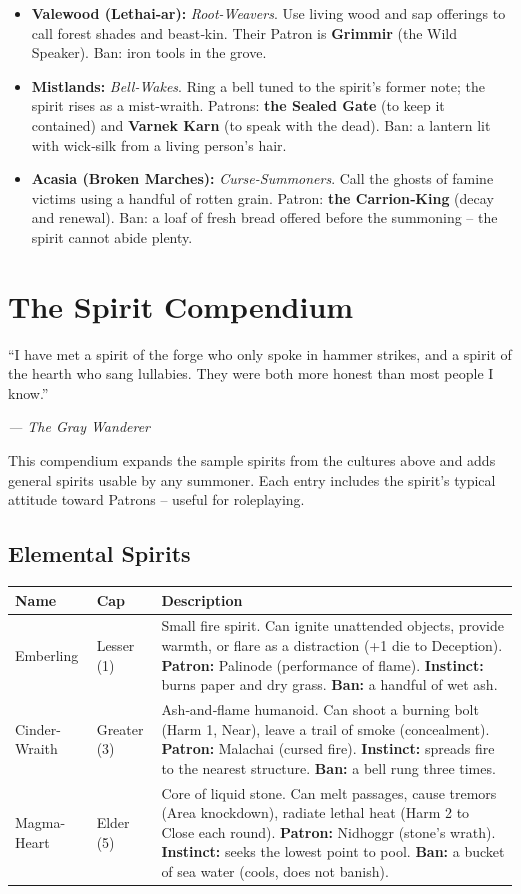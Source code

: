 \documentclass[10pt,a5paper]{book}
\begin{document}
\begin{itemize}
    \item \textbf{Valewood (Lethai‑ar):} \textit{Root-Weavers}. Use living wood and sap offerings to call forest shades and beast‑kin. Their Patron is \textbf{Grimmir} (the Wild Speaker). Ban: iron tools in the grove.
    \item \textbf{Mistlands:} \textit{Bell-Wakes}. Ring a bell tuned to the spirit’s former note; the spirit rises as a mist‑wraith. Patrons: \textbf{the Sealed Gate} (to keep it contained) and \textbf{Varnek Karn} (to speak with the dead). Ban: a lantern lit with wick‑silk from a living person’s hair.
    \item \textbf{Acasia (Broken Marches):} \textit{Curse-Summoners}. Call the ghosts of famine victims using a handful of rotten grain. Patron: \textbf{the Carrion‑King} (decay and renewal). Ban: a loaf of fresh bread offered before the summoning – the spirit cannot abide plenty.
\end{itemize}

\clearpage

\chapter{The Spirit Compendium}
\epigraph{“I have met a spirit of the forge who only spoke in hammer strikes, and a spirit of the hearth who sang lullabies. They were both more honest than most people I know.”}{\textit{— The Gray Wanderer}}

This compendium expands the sample spirits from the cultures above and adds general spirits usable by any summoner. Each entry includes the spirit’s typical attitude toward Patrons – useful for roleplaying.

\section{Elemental Spirits}

\begin{longtable}{p{3cm} p{2.5cm} p{8cm}}
\toprule
Name & Cap & Description \\
\midrule
Emberling & Lesser (1) & Small fire spirit. Can ignite unattended objects, provide warmth, or flare as a distraction (+1 die to Deception). \textbf{Patron:} Palinode (performance of flame). \textbf{Instinct:} burns paper and dry grass. \textbf{Ban:} a handful of wet ash. \\
Cinder-Wraith & Greater (3) & Ash‑and‑flame humanoid. Can shoot a burning bolt (Harm 1, Near), leave a trail of smoke (concealment). \textbf{Patron:} Malachai (cursed fire). \textbf{Instinct:} spreads fire to the nearest structure. \textbf{Ban:} a bell rung three times. \\
Magma-Heart & Elder (5) & Core of liquid stone. Can melt passages, cause tremors (Area knockdown), radiate lethal heat (Harm 2 to Close each round). \textbf{Patron:} Nidhoggr (stone’s wrath). \textbf{Instinct:} seeks the lowest point to pool. \textbf{Ban:} a bucket of sea water (cools, does not banish). \\
\bottomrule
\end{longtable}
\end{document}
